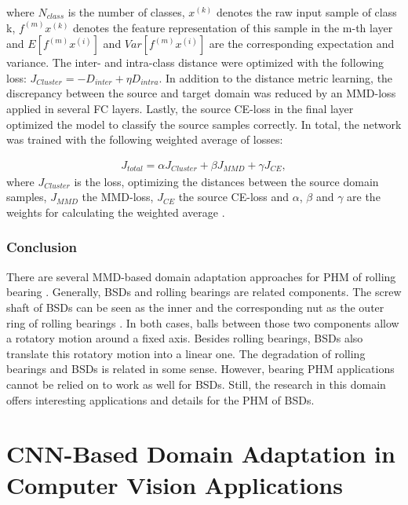 where $N_{class}$ is the number of classes, $x^{(k)}$ denotes the raw input sample of class k, $f^{(m)}x^{(k)}$ denotes the feature representation of this sample in the m-th layer and $E[f^{(m)}x^{(i)}]$ and $Var[f^{(m)}x^{(i)}]$ are the corresponding expectation and variance. The inter- and intra-class distance were optimized with the following loss: $J_{Cluster} = - D_{inter} + \eta D_{intra}$. In addition to the distance metric learning, the discrepancy between the source and target domain was reduced by an MMD-loss applied in several FC layers. Lastly, the source CE-loss in the final layer optimized the model to classify the source samples correctly. In total, the network was trained with the following weighted average of losses: 

\begin{equation}
    \begin{aligned}
    J_{total} = \alpha J_{Cluster} + \beta J_{MMD} + \gamma J_{CE}, 
    \end{aligned}
\end{equation}
where $J_{Cluster}$ is the loss, optimizing the distances between the source domain samples, $J_{MMD}$ the MMD-loss,  $J_{CE}$ the source CE-loss and $\alpha$, $\beta$ and $\gamma$ are the weights for calculating the weighted average \cite{Li2018}.

\subsubsection{Conclusion}
There are several MMD-based domain adaptation approaches for PHM of rolling bearing \cite{AN201942} \cite{Li2018} \cite{Guo2019} \cite{Singh2019} \cite{Kang2020}. Generally, BSDs and rolling bearings are related components. The screw shaft of BSDs can be seen as the inner and the corresponding nut as the outer ring of rolling bearings \cite{Lee2015}. In both cases, balls between those two components allow a rotatory motion around a fixed axis. Besides rolling bearings, BSDs also translate this rotatory motion into a linear one. The degradation of rolling bearings and BSDs is related in some sense. However, bearing PHM applications cannot be relied on to work as well for BSDs. Still, the research in this domain offers interesting applications and details for the PHM of BSDs. 

\section{CNN-Based Domain Adaptation in Computer Vision Applications} \label{sec:domain_adaption_CV}

